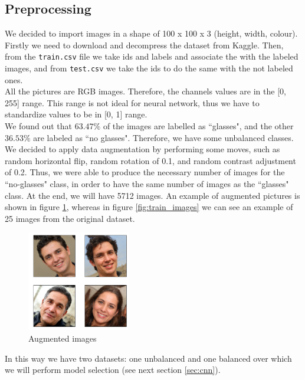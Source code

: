 \documentclass{article}
\begin{document}
\subsection{Preprocessing}
We decided to import images in a shape of 100 x 100 x 3 (height, width, colour). Firstly we need to download and decompress the dataset from Kaggle. Then, from the \texttt{train.csv} file we take ids and labels and associate the with the labeled images, and from \texttt{test.csv} we take the ids to do the same with the not labeled ones.
\\
All the pictures are RGB images. Therefore, the channels values are in the [0, 255] range. This range is not ideal for neural network, thus we have to standardize values to be in [0, 1] range.
\\

We found out that $63.47\%$ of the images are labelled as ``glasses", and the other  $36.53\%$ are labeled as ``no glasses". Therefore, we have some unbalanced classes. We decided to apply data augmentation by performing some moves, such as random horizontal flip, random rotation of 0.1, and random contrast adjustment of 0.2. Thus, we were able to produce the necessary number of images for the ``no-glasses" class, in order to have the same number of images as the ``glasses" class. At the end, we will have 5712 images. An example of augmented pictures is shown in figure \ref{fig:augm_imgs}, whereas in figure \ref{fig:train_images} we can see an example of 25 images from the original dataset.

\begin{figure}[h]
    \centering
    \includegraphics[width=0.4\textwidth]{images/augm_imgs.png}
    \caption{Augmented images}
    \label{fig:augm_imgs}
\end{figure}

In this way we have two datasets: one unbalanced and one balanced over which we will perform model selection (see next section \ref{sec:cnn}).
\end{document}
